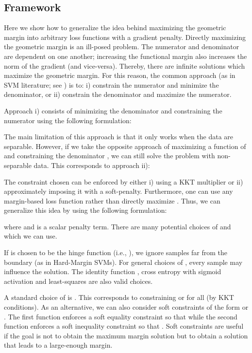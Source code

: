 \documentclass{article}
\begin{document}
\subsection{Framework}

Here we show how to generalize the idea behind maximizing the geometric margin into arbitrary loss functions with a gradient penalty. Directly maximizing the geometric margin is an ill-posed problem. The numerator and denominator are dependent on one another; increasing the functional margin also increases the norm of the gradient (and vice-versa). Thereby, there are infinite solutions which maximize the geometric margin. For this reason, the common approach (as in SVM literature; see \citet{cortes1995support}) is to: i) constrain the numerator and minimize the denominator, or ii) constrain the denominator and maximize the numerator.

Approach i) consists of minimizing the denominator and constraining the numerator using the following formulation:


The main limitation of this approach is that it only works when the data are separable. However, if we take the opposite approach of maximizing a function of  and constraining the denominator , we can still solve the problem with non-separable data. This corresponds to approach ii):


The constraint chosen can be enforced by either i) using a KKT multiplier \citep{kuhn1951nonlinear, karush1939minima} or ii) approximately imposing it with a soft-penalty. Furthermore, one can use any margin-based loss function rather than directly maximize . Thus, we can generalize this idea by using the following formulation:

where  and  is a scalar penalty term. There are many potential choices of  and  which we can use. 

If  is chosen to be the hinge function (i.e., ),
we ignore samples far from the boundary (as in Hard-Margin SVMs). For general choices of , every sample may influence the solution. The identity function , cross entropy with sigmoid activation  and least-squares  are also valid choices.

A standard choice of  is . This corresponds to constraining  or  for all  (by KKT conditions). As an alternative, we can also consider soft constraints of the form  or . The first function enforces a soft equality constraint so that   while the second function enforces a soft inequality constraint so that . Soft constraints are useful if the goal is not to obtain the maximum margin solution but to obtain a solution that leads to a large-enough margin.
\end{document}

